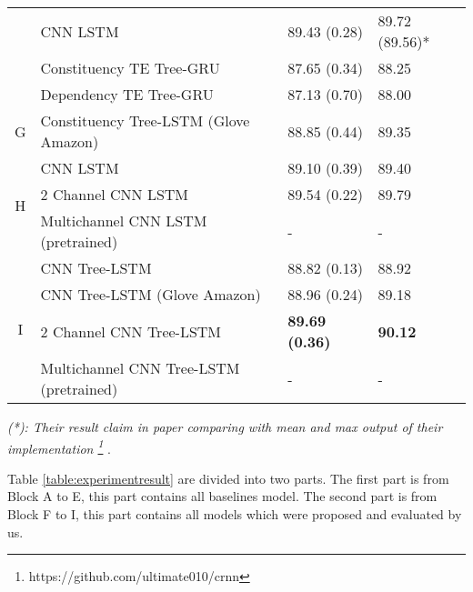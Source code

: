 \begin{table}[H]
\begin{tabular}{c|lll}
		 & CNN LSTM  \cite{cnn-rnn}					& 89.43 (0.28)  & 89.72 (89.56)*\Bstrut	\\
\Xhline{3\arrayrulewidth}
\Xhline{3\arrayrulewidth}
		 \multirow{2}{*}{F} & Constituency TE Tree-GRU                 & 87.65 (0.34) & 88.25\Tstrut \\
		  & Dependency TE Tree-GRU                   & 87.13 (0.70)  & 88.00\Bstrut \\ 
\hline
\hline
		\multirow{1}{*}{G} & Constituency Tree-LSTM  \cite{treeLSTM} (Glove Amazon) & 88.85 (0.44) & 89.35\Tstrut\Bstrut \\
\hline
\hline
		\multirow{3}{*}{H} & CNN LSTM 								& 89.10 (0.39)  & 89.40 \Tstrut  \\
		& 2 Channel CNN LSTM						& 89.54	(0.22) & 89.79	\\
		& Multichannel CNN LSTM (pretrained) & - & - \\
\hline 
		\multirow{4}{*}{I} & CNN Tree-LSTM                            & 88.82 (0.13) & 88.92 \\
		& CNN Tree-LSTM (Glove Amazon) 			& 88.96 (0.24) & 89.18 \\
		& 2 Channel CNN Tree-LSTM  &\textbf{89.69 (0.36)} & \textbf{90.12}	\\
		& Multichannel CNN Tree-LSTM (pretrained)		& - & -		\\
	\end{tabular}
\end{table}

\textit{(*): Their result claim in paper comparing with mean and max output of their implementation
\footnote{https://github.com/ultimate010/crnn}} .


Table \ref{table:experimentresult} are divided into two parts. 
The first part is from Block A to E, this part contains all baselines model.
The second part is from Block F to I, this part contains all models which were proposed and evaluated by us.

